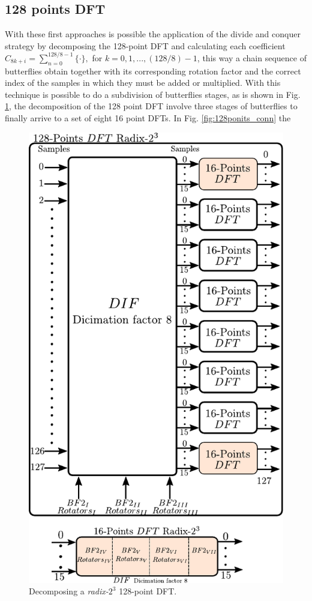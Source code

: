 \documentclass[journal,comsoc]{IEEEtran}
\begin{document}
\subsection{128 points DFT}
With these first approaches is possible the application of the divide and conquer strategy by decomposing the 128-point DFT and calculating each coefficient $C_{8k+i} = \sum_{n=0}^{128/8-1} \{ \cdot \}, $ for $k=0,1,...,(128/8)-1$, this way a  chain sequence of butterflies obtain together with its corresponding rotation factor and the correct index of the samples in which they must be added or multiplied. With this technique is possible to do a subdivision of butterflies stages, as is shown in Fig. \ref{fig:128_block_descomp}, the decomposition of the 128 point DFT involve three stages of butterflies to finally arrive to a set of eight 16 point DFTs. In Fig. \ref{fig:128ponits_conn} the 

\begin{figure}
	\centering
	\includegraphics[width=\linewidth]{Diagramas/miSeccionFiguras/BloquesDft.pdf}
	\caption{Decomposing a \textit{radix-}$2^3$ 128-point DFT.}
	\label{fig:128_block_descomp}
\end{figure}
\end{document}
